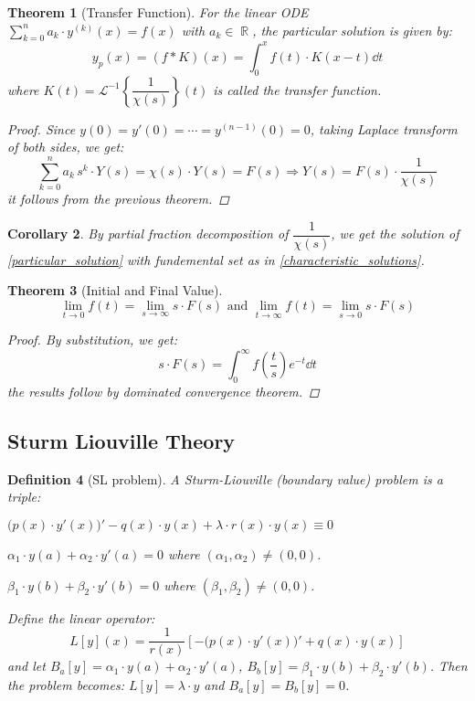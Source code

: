 \documentclass[12pt]{article}
\DeclareMathOperator{\R}{\mathbb{R}}
\newcommand{\der}[2][n]{{#2}^{(#1)}}
\newtheorem{theorem}{Theorem}[subsection]
\newtheorem{definition}[theorem]{Definition}
\newtheorem{corollary}[theorem]{Corollary}
\begin{document}
\begin{theorem}[Transfer Function]
  For the linear ODE $\sum_{k=0}^n a_k\cdot\der[k]{y}(x)=f(x)$ with $a_k\in\R$, the particular solution is given by: $$y_p(x)=(f*K)(x)=\int_0^x f(t)\cdot K(x-t)\dd{t}$$ where $K(t)=\mathcal{L}^{-1}\left\{\dfrac{1}{\chi(s)}\right\}(t)$ is called the transfer function.
  \begin{proof}
    Since $y(0)=y'(0)=\cdots=\der[n-1]{y}(0)=0$, taking Laplace transform of both sides, we get: $$\sum_{k=0}^n a_k\,s^k\cdot Y(s)=\chi(s)\cdot Y(s)=F(s)\Rightarrow Y(s)=F(s)\cdot \frac{1}{\chi(s)}$$ it follows from the previous theorem.
  \end{proof}
\end{theorem}

\begin{corollary}
  By partial fraction decomposition of $\dfrac{1}{\chi(s)}$, we get the solution of \ref{particular_solution} with fundemental set as in \ref{characteristic_solutions}.
\end{corollary}

\begin{theorem}[Initial and Final Value]
  $$\lim_{t\to 0}f(t)=\lim_{s\to\infty} s\cdot F(s)\text{ and }\lim_{t\to \infty}f(t)=\lim_{s\to 0} s\cdot F(s)$$
  \begin{proof}
    By substitution, we get: $$s\cdot F(s)=\int_0^\infty f\left(\frac{t}{s}\right) e^{-t}\dd{t}$$ the results follow by dominated convergence theorem.
  \end{proof}
\end{theorem}

\pagebreak

\subsection{Sturm Liouville Theory}

\begin{definition}[SL problem]
  A Sturm-Liouville (boundary value) problem is a triple:
  \begin{compactenum}[(i)]
    \item $\Big(p(x)\cdot y'(x)\Big)'-q(x)\cdot y(x)+\lambda\cdot r(x)\cdot y(x)\equiv 0$
    \item $\alpha_1\cdot y(a)+\alpha_2\cdot y'(a)=0$ where $(\alpha_1,\alpha_2)\neq (0,0)$.
    \item $\beta_1\cdot y(b)+\beta_2\cdot y'(b)=0$ where $(\beta_1,\beta_2)\neq (0,0)$.
  \end{compactenum}
  Define the linear operator: $$L[y](x)=\dfrac{1}{r(x)}\left[-\Big(p(x)\cdot y'(x)\Big)'+q(x)\cdot y(x)\right]$$ and let $B_a[y]=\alpha_1\cdot y(a)+\alpha_2\cdot y'(a)$, $B_b[y]=\beta_1\cdot y(b)+\beta_2\cdot y'(b)$. Then the problem becomes: $L[y]=\lambda\cdot y$ and $B_a[y]=B_b[y]=0$.
\end{definition}
\end{document}
